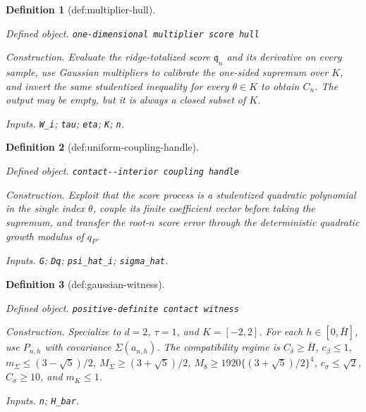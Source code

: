 \documentclass{article}
\newtheorem{definition}{Definition}
\begin{document}
\begin{definition}[def:multiplier-hull]\label{def:multiplier-hull}
\par\smallskip\noindent\emph{Defined object.} \texttt{one-\allowbreak{}dimensional multiplier score hull}
\par\smallskip\noindent\emph{Construction.} Evaluate the ridge-totalized score \(\mathfrak q_n\) and its derivative on every sample, use Gaussian multipliers to calibrate the one-sided supremum over \(K\), and invert the same studentized inequality for every \(\theta\in K\) to obtain \(C_n\). The output may be empty, but it is always a closed subset of \(K\).
\par\smallskip\noindent\emph{Inputs.} \texttt{W\_\allowbreak{}i}; \texttt{tau}; \texttt{eta}; \texttt{K}; \texttt{n}.
\end{definition}

\begin{definition}[def:uniform-coupling-handle]\label{def:uniform-coupling-handle}
\par\smallskip\noindent\emph{Defined object.} \texttt{contact-\allowbreak{}-\allowbreak{}interior coupling handle}
\par\smallskip\noindent\emph{Construction.} Exploit that the score process is a studentized quadratic polynomial in the single index \(\theta\), couple its finite coefficient vector before taking the supremum, and transfer the root-\(n\) score error through the deterministic quadratic growth modulus of \(q_P\).
\par\smallskip\noindent\emph{Inputs.} \texttt{G}; \texttt{Dq}; \texttt{psi\_\allowbreak{}hat\_\allowbreak{}i}; \texttt{sigma\_\allowbreak{}hat}.
\end{definition}

\begin{definition}[def:gaussian-witness]\label{def:gaussian-witness}
\par\smallskip\noindent\emph{Defined object.} \texttt{positive-\allowbreak{}definite contact witness}
\par\smallskip\noindent\emph{Construction.} Specialize to \(d=2\), \(\tau=1\), and \(K=[-2,2]\). For each \(h\in[0,\bar H]\), use \(P_{n,h}\) with covariance \(\Sigma(a_{n,h})\). The compatibility regime is \(C_{\delta}\geq\bar H\), \(c_{\beta}\leq1\), \(m_{\Sigma}\leq(3-\sqrt5)/2\), \(M_{\Sigma}\geq(3+\sqrt5)/2\), \(M_8\geq1920\{(3+\sqrt5)/2\}^4\), \(c_{\sigma}\leq\sqrt2\), \(C_{\sigma}\geq10\), and \(m_K\leq1\).
\par\smallskip\noindent\emph{Inputs.} \texttt{n}; \texttt{H\_\allowbreak{}bar}.
\end{definition}
\end{document}
